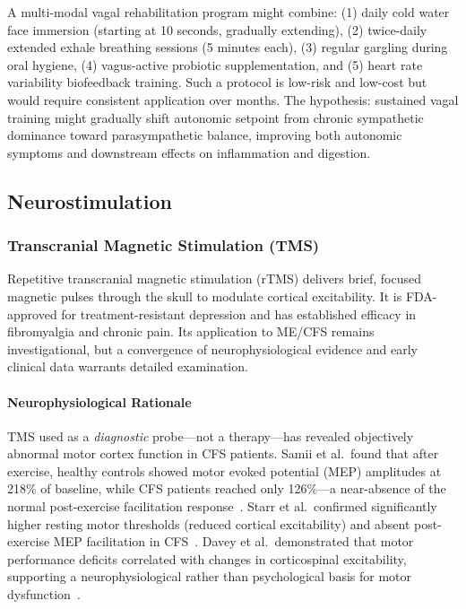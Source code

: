 \begin{speculation}
A multi-modal vagal rehabilitation program might combine: (1) daily cold water face immersion (starting at 10 seconds, gradually extending), (2) twice-daily extended exhale breathing sessions (5 minutes each), (3) regular gargling during oral hygiene, (4) vagus-active probiotic supplementation, and (5) heart rate variability biofeedback training. Such a protocol is low-risk and low-cost but would require consistent application over months. The hypothesis: sustained vagal training might gradually shift autonomic setpoint from chronic sympathetic dominance toward parasympathetic balance, improving both autonomic symptoms and downstream effects on inflammation and digestion.
\end{speculation}

\subsection{Neurostimulation}

\subsubsection{Transcranial Magnetic Stimulation (TMS)}
\label{subsubsec:tms-mecfs}

Repetitive transcranial magnetic stimulation (rTMS) delivers brief, focused magnetic pulses through the skull to modulate cortical excitability. It is FDA-approved for treatment-resistant depression and has established efficacy in fibromyalgia and chronic pain. Its application to ME/CFS remains investigational, but a convergence of neurophysiological evidence and early clinical data warrants detailed examination.

\paragraph{Neurophysiological Rationale}

TMS used as a \textit{diagnostic} probe---not a therapy---has revealed objectively abnormal motor cortex function in CFS patients. Samii et al.\ found that after exercise, healthy controls showed motor evoked potential (MEP) amplitudes at 218\% of baseline, while CFS patients reached only 126\%---a near-absence of the normal post-exercise facilitation response~\cite{Samii1996TMS}. Starr et al.\ confirmed significantly higher resting motor thresholds (reduced cortical excitability) and absent post-exercise MEP facilitation in CFS~\cite{Starr2000TMS}. Davey et al.\ demonstrated that motor performance deficits correlated with changes in corticospinal excitability, supporting a neurophysiological rather than psychological basis for motor dysfunction~\cite{Davey2003TMS}.

